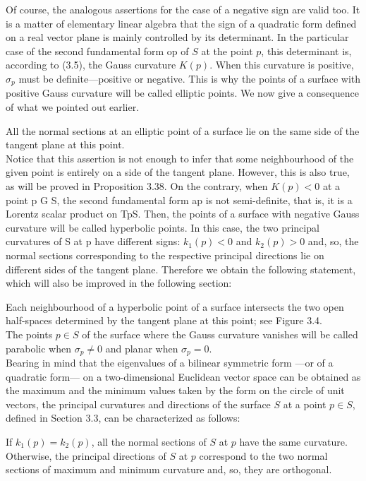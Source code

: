 Of course, the analogous assertions for the case of a negative sign are valid too. It is a matter of elementary linear algebra that the sign of a quadratic form defined on a real vector plane is mainly controlled by its determinant. In the particular case of the second fundamental form op of $S$ at the point $p$, this determinant is, according to (3.5), the Gauss curvature $K(p)$. When this curvature is positive, $\sigma_p$ must be definite—positive or negative. This is why the points of a surface with positive Gauss curvature will be called elliptic points. We now give a consequence of what we pointed out earlier.

All the normal sections at an elliptic point of a surface lie on the same side of the tangent plane at this point.
${ }$\\

Notice that this assertion is not enough to infer that some neighbourhood of the given point is entirely on a side of the tangent plane. However, this is also true, as will be proved in Proposition 3.38. On the contrary, when $K(p) < 0$ at a point p G S, the second fundamental form ap is not semi-definite, that is, it is a Lorentz scalar product on TpS. Then, the points of a surface with negative Gauss curvature will be called hyperbolic points. In this case, the two principal curvatures of S at p have different signs: $k_1(p) < 0$ and $k_2(p) > 0$ and, so, the normal sections corresponding to the respective principal directions lie on different sides of the tangent plane. Therefore we obtain the following statement, which will also be improved in the following section:

Each neighbourhood of a hyperbolic point of a surface intersects the two open half-spaces determined by the tangent plane at this point; see Figure 3.4.
${ }$\\

The points $p \in S$ of the surface where the Gauss curvature vanishes will be called parabolic when $\sigma_p \neq 0$ and planar when $\sigma_p = 0$.
${ }$\\

Bearing in mind that the eigenvalues of a bilinear symmetric form —or of a quadratic form— on a two-dimensional Euclidean vector space can be obtained as the maximum and the minimum values taken by the form on the circle of unit vectors, the principal curvatures and directions of the surface $S$ at a point $p \in S$, defined in Section 3.3, can be characterized as follows:

If $k_1(p) = k_2(p)$, all the normal sections of $S$ at $p$ have the same curvature. Otherwise, the principal directions of $S$ at $p$ correspond to the two normal sections of maximum and minimum curvature and, so, they are orthogonal.
${ }$\\

